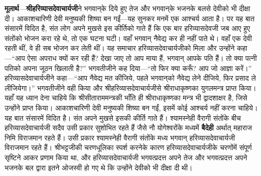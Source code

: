 \begin{sloppypar}\justifying{}
\textbf{मूलार्थ}—\textbf{श्रीहरिव्यास\-देवाचार्यजी}ने भगवान्‌के दिये हुए तेज और भगवान्‌के भजनके बलसे देवीको भी दीक्षा दी। आकाशचारिणी देवी मनुष्यकी शिष्या बन गईं—यह सुनकर मनमें एक आश्चर्य आता है। पर यह बात संसारमें विदित है, संत लोग अपने मुखसे इस कीर्तिको गाते हैं कि एक बार हरिव्यास\-देवजी जब आए हुए संतोंको भोजन करा रहे थे, तो एक घटना घटी। वहाँ भगवान् नैवेद्य कर ही नहीं पाते थे। वहाँ एक देवी रहती थीं, वे ही सब भोजन कर लेती थीं। यह समाचार हरिव्यास\-देवाचार्यजीको मिला और उन्होंने कहा—“आप ऐसा अपराध क्यों कर रही हैं? देखा जाए तो आप माया हैं, भगवान् आपके पति हैं। तो क्या पत्नी पतिको अपना जूठन खिलाती है?” भगवतीजीने कह दिया—“तो फिर क्या करूँ? आप जो आज्ञा करें।” हरिव्यास\-देवाचार्यजीने कहा—“आप नैवेद्य मत कीजिये, पहले भगवान्‌को नैवेद्य लेने दीजिये, फिर प्रसाद ले लीजियेगा।” भगवतीजीने वही किया और श्रीहरिव्यास\-देवाचार्यजीसे श्रीराधा\-कृष्णका युगलमन्त्र प्राप्त किया। यहाँ यह ध्यान देना चाहिये कि श्रीसीता\-राममन्त्रकी भाँति ही श्रीराधा\-कृष्णका मन्त्र भी द्वादशाक्षर है, जिसे उन्होंने प्राप्त किया। आकाशचारिणी देवी मनुष्यकी शिष्या बन गईं, इसमें कोई आश्चर्य नहीं करना चाहिये। यह बात संसारमें विदित है। संत अपने मुखसे इसकी कीर्ति गाते हैं। श्यामस्नेही वैरागी संतोंके बीच हरिव्यास\-देवाचार्यजी सदैव उसी प्रकार सुशोभित रहते हैं जैसे नौ योगेश्वरोंके मध्यमें \textbf{बैदेही} अर्थात् महाराज निमि विराजमान रहते हैं। उसी प्रकार श्यामस्नेही वैरागी संतोंके मध्य भगवान् हरिव्यास\-देवाचार्यजी विराजमान रहते हैं। श्रीभट्टजीकी चरणधूलिका स्पर्श करनेके कारण हरिव्यास\-देवाचार्यजीके चरणोंमें संपूर्ण सृष्टिने आकर प्रणाम किया था, और हरिव्यास\-देवाचार्यजी भगवत्प्रदत्त अपने तेज और भगवत्प्रदत्त अपने भजनके बल द्वारा इतने ओजस्वी हो गए थे कि उन्होंने देवीको भी दीक्षा दी थी।
\end{sloppypar}


